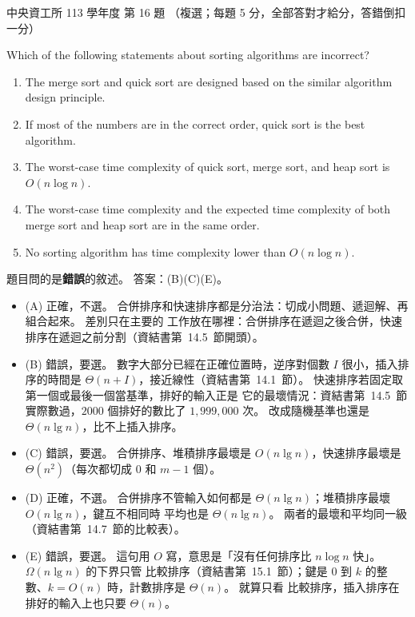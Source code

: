 \begin{pastexam}[label={px:ncu-113-dsa-16}]{中央資工所 113 學年度 第 16 題}
（複選；每題 5 分，全部答對才給分，答錯倒扣一分）

Which of the following statements about sorting algorithms are incorrect?
\begin{enumerate}[label=(\Alph*)]
\item The merge sort and quick sort are designed based on the similar algorithm design principle.
\item If most of the numbers are in the correct order, quick sort is the best algorithm.
\item The worst-case time complexity of quick sort, merge sort, and heap sort is $O(n\log n)$.
\item The worst-case time complexity and the expected time complexity of both merge sort and heap sort are in
the same order.
\item No sorting algorithm has time complexity lower than $O(n\log n)$.
\end{enumerate}
\end{pastexam}

\begin{pastsoln}
題目問的是\textbf{錯誤}的敘述。 答案：(B)(C)(E)。
\begin{itemize}
\item (A) 正確，不選。 合併排序和快速排序都是分治法：切成小問題、遞迴解、再組合起來。 差別只在主要的
工作放在哪裡：合併排序在遞迴之後合併，快速排序在遞迴之前分割（資結書第~14.5~節開頭）。
\item (B) 錯誤，要選。 數字大部分已經在正確位置時，逆序對個數 $I$ 很小，插入排序的時間是
$\Theta(n + I)$，接近線性（資結書第~14.1~節）。 快速排序若固定取第一個或最後一個當基準，排好的輸入正是
它的最壞情況：資結書第~14.5~節實際數過，$2000$ 個排好的數比了 $1{,}999{,}000$ 次。 改成隨機基準也還是
$\Theta(n\lg n)$，比不上插入排序。
\item (C) 錯誤，要選。 合併排序、堆積排序最壞是 $O(n\lg n)$，快速排序最壞是 $\Theta(n^2)$（每次都切成
$0$ 和 $m - 1$ 個）。
\item (D) 正確，不選。 合併排序不管輸入如何都是 $\Theta(n\lg n)$；堆積排序最壞 $O(n\lg n)$，鍵互不相同時
平均也是 $\Theta(n\lg n)$。 兩者的最壞和平均同一級（資結書第~14.7~節的比較表）。
\item (E) 錯誤，要選。 這句用 $O$ 寫，意思是「沒有任何排序比 $n\log n$ 快」。 $\Omega(n\lg n)$ 的下界只管
比較排序（資結書第~15.1~節）；鍵是 $0$ 到 $k$ 的整數、$k = O(n)$ 時，計數排序是 $\Theta(n)$。 就算只看
比較排序，插入排序在排好的輸入上也只要 $\Theta(n)$。
\end{itemize}
\end{pastsoln}
